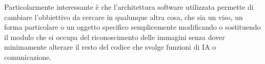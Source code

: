 Particolarmente interessante è che l'architettura software utilizzata permette 
di cambiare l'obbiettivo da cercare in qualunque altra cosa, che sia un viso, un 
forma particolare o un oggetto specifico semplicemente modificando o sostituendo il modulo che si occupa 
del riconoscimento delle immagini senza dover minimamente alterare il resto del 
codice che svolge funzioni di IA o comunicazione.


